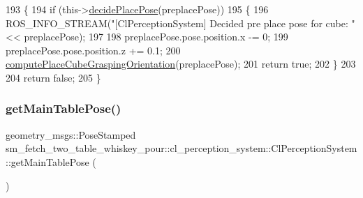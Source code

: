 \begin{DoxyCode}
193             \{
194                 \textcolor{keywordflow}{if} (this->\hyperlink{classsm__fetch__two__table__whiskey__pour_1_1cl__perception__system_1_1ClPerceptionSystem_a803c5d30981b6368e854dd9e8972f129}{decidePlacePose}(preplacePose))
195                 \{
196                     ROS\_INFO\_STREAM(\textcolor{stringliteral}{"[ClPerceptionSystem] Decided pre place pose for cube: "} << 
      preplacePose);
197 
198                     preplacePose.pose.position.x -= 0;
199                     preplacePose.pose.position.z += 0.1;
200                     \hyperlink{classsm__fetch__two__table__whiskey__pour_1_1cl__perception__system_1_1ClPerceptionSystem_a349d7fbb4a63fcfed8ccef0d9e18c7e5}{computePlaceCubeGraspingOrientation}(preplacePose);
201                     \textcolor{keywordflow}{return} \textcolor{keyword}{true};
202                 \}
203 
204                 \textcolor{keywordflow}{return} \textcolor{keyword}{false};
205             \}
\end{DoxyCode}
\mbox{\label{classsm__fetch__two__table__whiskey__pour_1_1cl__perception__system_1_1ClPerceptionSystem_a405a056a25bc0818b3e490eeeeeef98d}} 
\subsubsection{\texorpdfstring{get\+Main\+Table\+Pose()}{getMainTablePose()}}
{\footnotesize\ttfamily geometry\+\_\+msgs\+::\+Pose\+Stamped sm\+\_\+fetch\+\_\+two\+\_\+table\+\_\+whiskey\+\_\+pour\+::cl\+\_\+perception\+\_\+system\+::\+Cl\+Perception\+System\+::get\+Main\+Table\+Pose (\begin{DoxyParamCaption}{ }\end{DoxyParamCaption})\hspace{0.3cm}{\ttfamily [inline]}}



